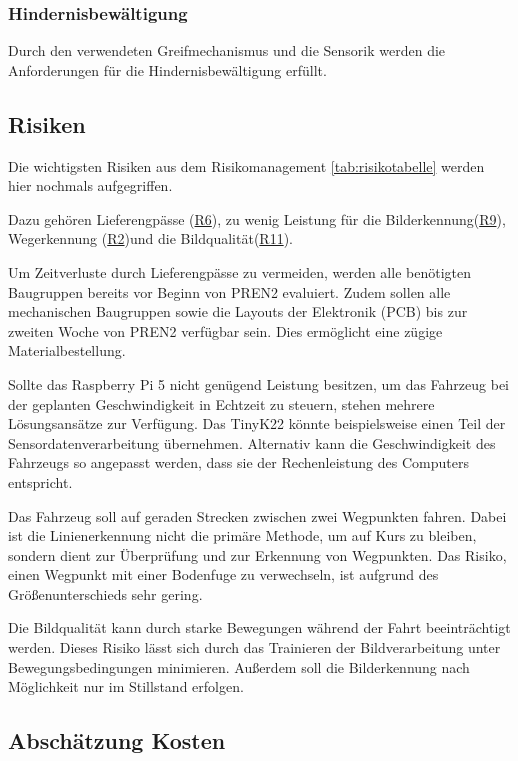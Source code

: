 \documentclass[../main.tex]{subfiles}
\begin{document}
\subsubsection{Hindernisbewältigung}
Durch den verwendeten Greifmechanismus und die Sensorik werden die Anforderungen für die Hindernisbewältigung erfüllt.

\newpage
\subsection{Risiken}
Die wichtigsten Risiken aus dem Risikomanagement \ref{tab:risikotabelle} werden hier nochmals aufgegriffen.

Dazu gehören Lieferengpässe (\hyperlink{R6}{R6}), zu wenig Leistung für die Bilderkennung(\hyperlink{R9}{R9}), Wegerkennung (\hyperlink{R2}{R2})und die Bildqualität(\hyperlink{R11}{R11}). 

Um Zeitverluste durch Lieferengpässe zu vermeiden, werden alle benötigten Baugruppen bereits vor Beginn von PREN2 evaluiert. Zudem sollen alle mechanischen Baugruppen sowie die Layouts der Elektronik (PCB) bis zur zweiten Woche von PREN2 verfügbar sein. Dies ermöglicht eine zügige Materialbestellung.

Sollte das Raspberry Pi 5 nicht genügend Leistung besitzen, um das Fahrzeug bei der geplanten Geschwindigkeit in Echtzeit zu steuern, stehen mehrere Lösungsansätze zur Verfügung. Das TinyK22 könnte beispielsweise einen Teil der Sensordatenverarbeitung übernehmen. Alternativ kann die Geschwindigkeit des Fahrzeugs so angepasst werden, dass sie der Rechenleistung des Computers entspricht.

Das Fahrzeug soll auf geraden Strecken zwischen zwei Wegpunkten fahren. Dabei ist die Linienerkennung nicht die primäre Methode, um auf Kurs zu bleiben, sondern dient zur Überprüfung und zur Erkennung von Wegpunkten. Das Risiko, einen Wegpunkt mit einer Bodenfuge zu verwechseln, ist aufgrund des Größenunterschieds sehr gering.

Die Bildqualität kann durch starke Bewegungen während der Fahrt beeinträchtigt werden. Dieses Risiko lässt sich durch das Trainieren der Bildverarbeitung unter Bewegungsbedingungen minimieren. Außerdem soll die Bilderkennung nach Möglichkeit nur im Stillstand erfolgen.

\subsection{Abschätzung Kosten}
\end{document}
